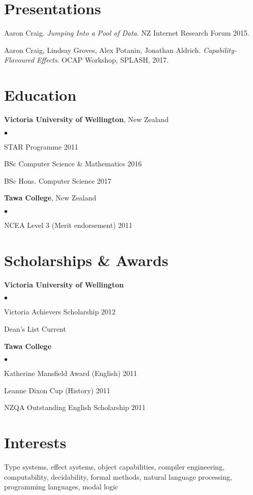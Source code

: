 \documentclass[margin,line]{res}
\newenvironment{list2}{
  \begin{list}{$\bullet$}{%
      \setlength{\itemsep}{0in}
      \setlength{\parsep}{0in} \setlength{\parskip}{0in}
      \setlength{\topsep}{0in} \setlength{\partopsep}{0in}
      \setlength{\leftmargin}{0.2in}}}
  {\end{list}}
\begin{document}
\begin{resume}



\section{\sc Presentations}
Aaron Craig. {\it Jumping Into a Pool of Data}. NZ Internet Research Forum 2015.


Aaron Craig, Lindsay Groves, Alex Potanin, Jonathan Aldrich. {\it Capability-Flavoured Effects}. OCAP Workshop, SPLASH, 2017.

\section{\sc Education}
{\bf Victoria University of Wellington}, New Zealand
\begin{list2}
	\item STAR Programme \hfill 2011
	\item BSc Computer Science \& Mathematics \hfill 2016
	\item BSc Hons. Computer Science \hfill 2017
\end{list2}

{\bf Tawa College}, New Zealand
\begin{list2}
	\item NCEA Level 3 (Merit endorsement) \hfill 2011
\end{list2}

\section{\sc Scholarships \& Awards}

{\bf Victoria University of Wellington}
\begin{list2}
	\item Victoria Achievers Scholarship \hfill 2012
	\item Dean's List \hfill Current
\end{list2}

{\bf Tawa College}
\begin{list2}
	\item Katherine Mansfield Award (English) \hfill 2011
	\item Leanne Dixon Cup (History) \hfill 2011
	\item NZQA Outstanding English Scholarship \hfill 2011
\end{list2}


\section{\sc Interests} Type systems, effect systems, object capabilities, compiler engineering, computability, decidability, formal methods, natural language processing, programming languages, modal logic



\end{resume}
\end{document}
